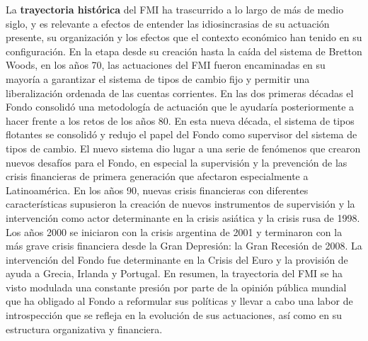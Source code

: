 \documentclass{nuevotema}
\begin{document}
La \textbf{trayectoria histórica} del FMI ha trascurrido a lo largo de más de medio siglo, y es relevante a efectos de entender las idiosincrasias de su actuación presente, su organización y los efectos que el contexto económico han tenido en su configuración. En la etapa desde su creación hasta la caída del sistema de Bretton Woods, en los años 70, las actuaciones del FMI fueron encaminadas en su mayoría a garantizar el sistema de tipos de cambio fijo y permitir una liberalización ordenada de las cuentas corrientes. En las dos primeras décadas el Fondo consolidó una metodología de actuación que le ayudaría posteriormente a hacer frente a los retos de los años 80. En esta nueva década, el sistema de tipos flotantes se consolidó y redujo el papel del Fondo como supervisor del sistema de tipos de cambio. El nuevo sistema dio lugar a una serie de fenómenos que crearon nuevos desafíos para el Fondo, en especial la supervisión y la prevención de las crisis financieras de primera generación que afectaron especialmente a Latinoamérica. En los años 90, nuevas crisis financieras con diferentes características supusieron la creación de nuevos instrumentos de supervisión y la intervención como actor determinante en la crisis asiática y la crisis rusa de 1998. Los años 2000 se iniciaron con la crisis argentina de 2001 y terminaron con la más grave crisis financiera desde la Gran Depresión: la Gran Recesión de 2008. La intervención del Fondo fue determinante en la Crisis del Euro y la provisión de ayuda a Grecia, Irlanda y Portugal. En resumen, la trayectoria del FMI se ha visto modulada una constante presión por parte de la opinión pública mundial que ha obligado al Fondo a reformular sus políticas y llevar a cabo una labor de introspección que se refleja en la evolución de sus actuaciones, así como en su estructura organizativa y financiera.
\end{document}
